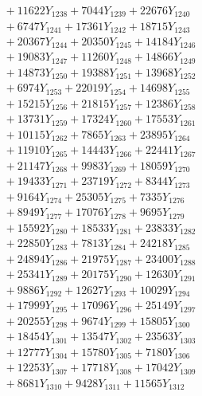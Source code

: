 \documentclass[a4paper,10pt]{article}
\begin{document}
{\begin{align}
&\;  + 11622 Y_{1238} + 7044 Y_{1239} + 22676 Y_{1240} \\[0.3ex]
&\;  + 6747 Y_{1241} + 17361 Y_{1242} + 18715 Y_{1243} \\[0.3ex]
&\;  + 20367 Y_{1244} + 20350 Y_{1245} + 14184 Y_{1246} \\[0.3ex]
&\;  + 19083 Y_{1247} + 11260 Y_{1248} + 14866 Y_{1249} \\[0.3ex]
&\;  + 14873 Y_{1250} + 19388 Y_{1251} + 13968 Y_{1252} \\[0.3ex]
&\;  + 6974 Y_{1253} + 22019 Y_{1254} + 14698 Y_{1255} \\[0.3ex]
&\;  + 15215 Y_{1256} + 21815 Y_{1257} + 12386 Y_{1258} \\[0.5ex]\allowbreak
&\;  + 13731 Y_{1259} + 17324 Y_{1260} + 17553 Y_{1261} \\[0.3ex]
&\;  + 10115 Y_{1262} + 7865 Y_{1263} + 23895 Y_{1264} \\[0.3ex]
&\;  + 11910 Y_{1265} + 14443 Y_{1266} + 22441 Y_{1267} \\[0.3ex]
&\;  + 21147 Y_{1268} + 9983 Y_{1269} + 18059 Y_{1270} \\[0.3ex]
&\;  + 19433 Y_{1271} + 23719 Y_{1272} + 8344 Y_{1273} \\[0.3ex]
&\;  + 9164 Y_{1274} + 25305 Y_{1275} + 7335 Y_{1276} \\[0.3ex]
&\;  + 8949 Y_{1277} + 17076 Y_{1278} + 9695 Y_{1279} \\[0.3ex]
&\;  + 15592 Y_{1280} + 18533 Y_{1281} + 23833 Y_{1282} \\[0.3ex]
&\;  + 22850 Y_{1283} + 7813 Y_{1284} + 24218 Y_{1285} \\[0.3ex]
&\;  + 24894 Y_{1286} + 21975 Y_{1287} + 23400 Y_{1288} \\[0.5ex]\allowbreak
&\;  + 25341 Y_{1289} + 20175 Y_{1290} + 12630 Y_{1291} \\[0.3ex]
&\;  + 9886 Y_{1292} + 12627 Y_{1293} + 10029 Y_{1294} \\[0.3ex]
&\;  + 17999 Y_{1295} + 17096 Y_{1296} + 25149 Y_{1297} \\[0.3ex]
&\;  + 20255 Y_{1298} + 9674 Y_{1299} + 15805 Y_{1300} \\[0.3ex]
&\;  + 18454 Y_{1301} + 13547 Y_{1302} + 23563 Y_{1303} \\[0.3ex]
&\;  + 12777 Y_{1304} + 15780 Y_{1305} + 7180 Y_{1306} \\[0.3ex]
&\;  + 12253 Y_{1307} + 17718 Y_{1308} + 17042 Y_{1309} \\[0.3ex]
&\;  + 8681 Y_{1310} + 9428 Y_{1311} + 11565 Y_{1312} \\[0.3ex]

\end{align}}
\end{document}
